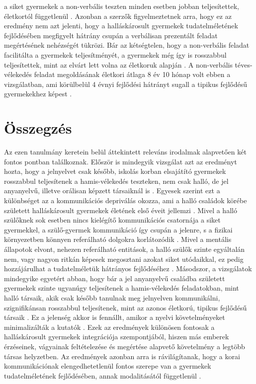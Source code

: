 a siket gyermekek a non-verbális teszten minden esetben jobban teljesítettek, életkortól
függetlenül \autocite{figueras-costa_harris_2001}. Azonban a szerzők figyelmeztetnek arra, hogy ez az eredmény nem azt
jelenti, hogy a halláskárosult gyermekek tudatelméletének fejlődésében megfigyelt hátrány
csupán a verbálisan prezentált feladat megértésének nehézségét tükrözi. Bár az kétségtelen,
hogy a non-verbális feladat facilitálta a gyermekek teljesítményét, a gyermekek még így is
rosszabbul teljesítettek, mint az elvárt lett volna az életkoruk alapján \autocite{figueras-costa_harris_2001}. A non-verbális
téves-vélekedés feladat megoldásának életkori átlaga 8 év 10 hónap volt ebben a vizsgálatban,
ami körülbelül 4 évnyi fejlődési hátrányt sugall a tipikus fejlődésű gyermekekhez képest
\autocite{figueras-costa_harris_2001}.

\pagebreak

\section*{Összegzés}

Az ezen tanulmány keretein belül áttekintett releváns irodalmak alapvetően két fontos
pontban találkoznak. Először is mindegyik vizsgálat azt az eredményt hozta, hogy a jelnyelvet
csak később, iskolás korban elsajátító gyermekek rosszabbul teljesítenek a hamis-vélekedés
teszteken, nem csak halló, de jel anyanyelvű, illetve orálisan képzett társaiknál is \autocite{peterson_slaughter_2006,woolfe_want_siegal_2002,peterson_siegal_1999}.
Egyesek szerint ezt a különbséget az a kommunikációs depriválás okozza, ami a halló
családok körébe született halláskárosult gyermekek életének első éveit jellemzi \autocite{perner_leekam_wimmer_1987}. Mivel a
halló szülőknek sok esetben nincs kielégítő kommunikációs csatornája a siket gyermekkel, a
szülő-gyermek kommunikáció így csupán a jelenre, s a fizikai környezetben könnyen
referálható dolgokra korlátozódik \autocite{peterson_siegal_2000}. Mivel a mentális állapotok elvont, nehezen
referálható entitások, a halló szülők szinte egyáltalán nem, vagy nagyon ritkán képesek
megosztani azokat siket utódaikkal, ez pedig hozzájárulhat a tudatelméletük hátrányos
fejlődéséhez \autocite{peterson_siegal_2000}. Másodszor, a vizsgálatok mindegyike egyetért abban, hogy bár a
jel anyanyelvű családba született gyermekek szinte ugyanúgy teljesítenek a hamis-vélekedés
feladatokban, mint halló társaik, akik csak később tanulnak meg jelnyelven kommunikálni,
szignifikánsan rosszabbul teljesítenek, mint az azonos életkorú, tipikus fejlődésű társaik \autocite{peterson_slaughter_2006,woolfe_want_siegal_2002,peterson_siegal_1999}.
Ez a jelenség akkor is fennállt, amikor a nyelvi követelményeket minimalizálták a kutatók
\autocite{figueras-costa_harris_2001}. Ezek az eredmények különösen fontosak a halláskárosult gyermekek integrációja
szempontjából, hiszen más emberek érzéseinek, vágyainak feltételezése és megértése alapvető
követelmény a legtöbb társas helyzetben. Az eredmények azonban arra is rávilágítanak, hogy
a korai kommunikációnak elengedhetetlenül fontos szerepe van a gyermekek
tudatelméletének fejlődésében, annak modalitásától függetlenül \autocite{peterson_2004}.